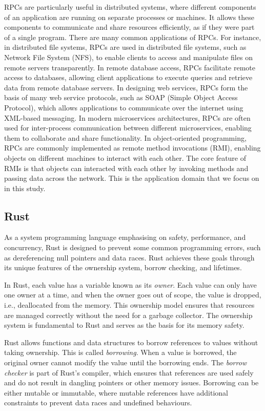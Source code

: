 RPCs are particularly useful in distributed systems, where different components of an application are running on separate processes or machines. It allows these components to communicate and share resources efficiently, as if they were part of a single program. There are many common applications of RPCs. For instance, in distributed file systems, RPCs are used in distributed file systems, such as Network File System (NFS), to enable clients to access and manipulate files on remote servers transparently. In remote database access, RPCs facilitate remote access to databases, allowing client applications to execute queries and retrieve data from remote database servers. In designing web services, RPCs form the basis of many web service protocols, such as SOAP (Simple Object Access Protocol), which allows applications to communicate over the internet using XML-based messaging. In modern microservices architectures, RPCs are often used for inter-process communication between different microservices, enabling them to collaborate and share functionality. In object-oriented programming, RPCs are commonly implemented as remote method invocations (RMI), enabling objects on different machines to interact with each other. The core feature of RMIs is that objects can interacted with each other by invoking methods and passing data across the network. This is the application domain that we focus on in this study.

\subsection{Rust}
\label{chap3:background:rust}
As a system programming language emphasising on safety, performance, and concurrency, Rust is designed to prevent some common programming errors, such as dereferencing null pointers and data races. Rust achieves these goals through its unique features of the ownership system, borrow checking, and lifetimes.

In Rust, each value has a variable known as its \emph{owner}. Each value can only have one owner at a time, and when the owner goes out of scope, the value is dropped, i.e., deallocated from the memory. This ownership model ensures that resources are managed correctly without the need for a garbage collector. The ownership system is fundamental to Rust and serves as the basis for its memory safety.

Rust allows functions and data structures to borrow references to values without taking ownership. This is called \emph{borrowing}. When a value is borrowed, the original owner cannot modify the value until the borrowing ends. The \emph{borrow checker} is part of Rust's compiler, which ensures that references are used safely and do not result in dangling pointers or other memory issues. Borrowing can be either mutable or immutable, where mutable references have additional constraints to prevent data races and undefined behaviours.

